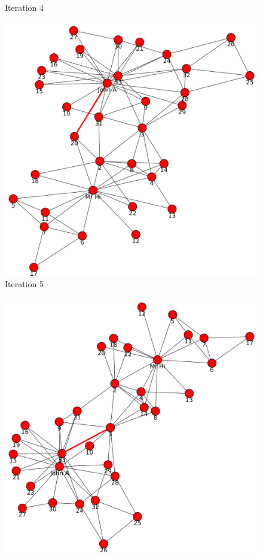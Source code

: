 \begin{itemize}
\begin{figure}[h!]
\begin{center}
\caption{Iteration 4}
\label{fig:q1fig4}
\end{center}
\end{figure}
\newpage
\begin{figure}[h!]
\begin{center}
\includegraphics[scale=0.55, keepaspectratio=true]{figures/graphs/EdgeHighlightedGraph5.pdf}
\caption{Iteration 5}
\label{fig:q1fig5}
\end{center}
\end{figure}
\newpage
\begin{figure}[h!]
\begin{center}
\includegraphics[scale=0.55, keepaspectratio=true]{figures/graphs/EdgeHighlightedGraph6.pdf}

\end{center}
\end{figure}
\end{itemize}
